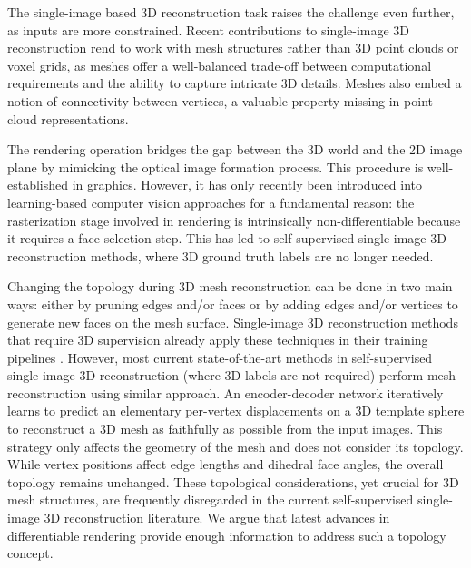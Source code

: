 The single-image based 3D reconstruction task raises the challenge even further, as inputs are more constrained. Recent contributions to single-image 3D reconstruction rend to work with mesh structures rather than 3D point clouds or voxel grids, as meshes offer a well-balanced trade-off between computational requirements and the ability to capture intricate 3D details. Meshes also embed a notion of connectivity between vertices, a valuable property missing in point cloud representations. 

The rendering operation bridges the gap between the 3D world and the 2D image plane by mimicking the optical image formation process. This procedure is well-established in graphics. However, it has only recently been introduced into learning-based computer vision approaches for a fundamental reason: the rasterization stage involved in rendering is intrinsically non-differentiable because it requires a face selection step. This has led to self-supervised single-image 3D reconstruction methods, where 3D ground truth labels are no longer needed.

Changing the topology during 3D mesh reconstruction can be done in two main ways: either by pruning edges and/or faces or by adding edges and/or vertices to generate new faces on the mesh surface. Single-image 3D reconstruction methods that require 3D supervision already apply these techniques in their training pipelines \citep{pan2019deep,nie2020total3dunderstanding,smith2019geometrics}. However, most current state-of-the-art methods in self-supervised single-image 3D reconstruction (where 3D labels are not required) perform mesh reconstruction using similar approach. An encoder-decoder network iteratively learns to predict an elementary per-vertex displacements on a 3D template sphere to reconstruct a 3D mesh as faithfully as possible from the input images. This strategy only affects the geometry of the mesh and does not consider its topology. While vertex positions affect edge lengths and dihedral face angles, the overall topology remains unchanged. These topological considerations, yet crucial for 3D mesh structures, are frequently disregarded in the current self-supervised single-image 3D reconstruction literature. We argue that latest advances in differentiable rendering \citep{liu2019soft,ravi2020accelarating} provide enough information to address such a topology concept.


